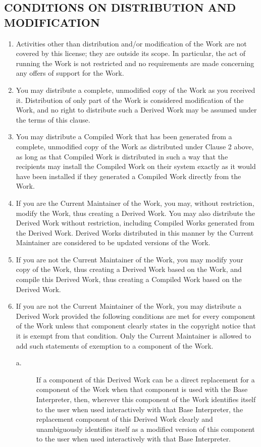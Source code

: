 \subsection{CONDITIONS ON DISTRIBUTION AND MODIFICATION}
\begin{enumerate}
\item Activities other than distribution and/or modification of the Work
are not covered by this license; they are outside its scope.  In
particular, the act of running the Work is not restricted and no
requirements are made concerning any offers of support for the Work.

\item You may distribute a complete, unmodified copy of the Work as you
received it.  Distribution of only part of the Work is considered
modification of the Work, and no right to distribute such a Derived
Work may be assumed under the terms of this clause.

\item You may distribute a Compiled Work that has been generated from a
complete, unmodified copy of the Work as distributed under Clause 2
above, as long as that Compiled Work is distributed in such a way that
the recipients may install the Compiled Work on their system exactly
as it would have been installed if they generated a Compiled Work
directly from the Work.

\item If you are the Current Maintainer of the Work, you may, without
restriction, modify the Work, thus creating a Derived Work.  You may
also distribute the Derived Work without restriction, including
Compiled Works generated from the Derived Work.  Derived Works
distributed in this manner by the Current Maintainer are considered to
be updated versions of the Work.

\item If you are not the Current Maintainer of the Work, you may modify
your copy of the Work, thus creating a Derived Work based on the Work,
and compile this Derived Work, thus creating a Compiled Work based on
the Derived Work.

\item If you are not the Current Maintainer of the Work, you may
distribute a Derived Work provided the following conditions are met
for every component of the Work unless that component clearly states
in the copyright notice that it is exempt from that condition.  Only
the Current Maintainer is allowed to add such statements of exemption 
to a component of the Work. 
\begin{description}
  \item [a.] If a component of this Derived Work can be a direct replacement
     for a component of the Work when that component is used with the
     Base Interpreter, then, wherever this component of the Work
     identifies itself to the user when used interactively with that
     Base Interpreter, the replacement component of this Derived Work
     clearly and unambiguously identifies itself as a modified version
     of this component to the user when used interactively with that
     Base Interpreter.
     

\end{description}
\end{enumerate}
